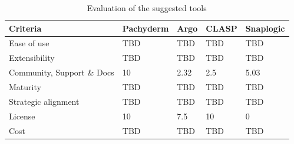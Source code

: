 





\begin{table}[htb]
    \centering
    \begin{tabular}{|l|l|l|l|l|} \hline
        \textbf{Criteria}                                          & \textbf{Pachyderm}    & \textbf{Argo}         & \textbf{\ac{CLASP}}   & \textbf{Snaplogic}     \\ \hline
        Ease of use                                                & TBD                   & TBD                   & TBD                   & TBD                    \\ \hline
        Extensibility                                              & TBD                   & TBD                   & TBD                   & TBD                    \\ \hline
        Community, Support \& Docs                                 & 10                   & 2.32                   & 2.5                   & 5.03                   \\ \hline
        Maturity                                                   & TBD                   & TBD                   & TBD                   & TBD                    \\ \hline
        Strategic alignment                                        & TBD                   & TBD                   & TBD                   & TBD                    \\ \hline
        License                                                    & 10                    & 7.5                     & 10                    & 0                      \\ \hline
        Cost                                                       & TBD                   & TBD                   & TBD                   & TBD                    \\ \hline

    \end{tabular}
    \caption{Evaluation of the suggested tools}
    \label{tab:evaluation_of_the_suggested_tools}
\end{table}



